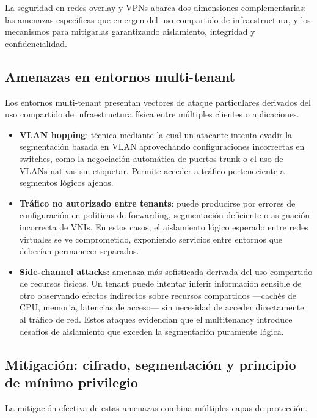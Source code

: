 
La seguridad en redes overlay y VPNs abarca dos dimensiones complementarias: las amenazas específicas que emergen del uso compartido de infraestructura, y los mecanismos para mitigarlas garantizando aislamiento, integridad y confidencialidad.

\subsection{Amenazas en entornos multi-tenant}

Los entornos multi-tenant presentan vectores de ataque particulares derivados del uso compartido de infraestructura física entre múltiples clientes o aplicaciones.

\begin{itemize}
    \item \textbf{VLAN hopping}: técnica mediante la cual un atacante intenta evadir la segmentación basada en VLAN aprovechando configuraciones incorrectas en switches, como la negociación automática de puertos trunk o el uso de VLANs nativas sin etiquetar. Permite acceder a tráfico perteneciente a segmentos lógicos ajenos.

    \item \textbf{Tráfico no autorizado entre tenants}: puede producirse por errores de configuración en políticas de forwarding, segmentación deficiente o asignación incorrecta de VNIs. En estos casos, el aislamiento lógico esperado entre redes virtuales se ve comprometido, exponiendo servicios entre entornos que deberían permanecer separados.

    \item \textbf{Side-channel attacks}: amenaza más sofisticada derivada del uso compartido de recursos físicos. Un tenant puede intentar inferir información sensible de otro observando efectos indirectos sobre recursos compartidos —cachés de CPU, memoria, latencias de acceso— sin necesidad de acceder directamente al tráfico de red. Estos ataques evidencian que el multitenancy introduce desafíos de aislamiento que exceden la segmentación puramente lógica.
\end{itemize}

\subsection{Mitigación: cifrado, segmentación y principio de mínimo privilegio}

La mitigación efectiva de estas amenazas combina múltiples capas de protección.

